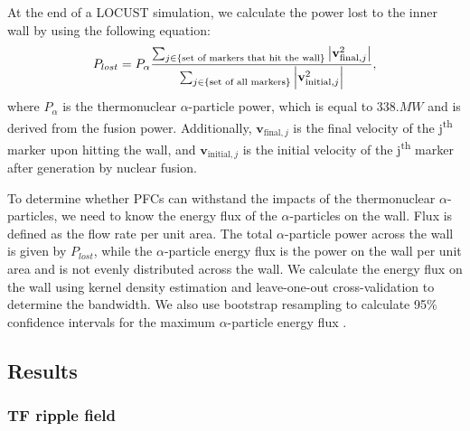 \documentclass[10pt, a4paper, twoside]{article}
\begin{document}
At the end of a LOCUST simulation, we calculate the power lost to the inner wall by using the following equation: 
\begin{equation} 
P_{lost} = P_\alpha \frac{\sum_{j\in \text{\{set of markers that hit the wall\}}}\abs{\textbf{v}_{\text{final}, j}^2}}{\sum_{j \in \{\text{set of all markers}\}} \abs{\mathbf{v}_{\text{initial}, j}^2 }}, 
\end{equation}
where $P_\alpha$ is the thermonuclear $\alpha$-particle power, which is equal to $\si{338.MW}$ and is derived from the fusion power. Additionally, $\mathbf{v}_{\text{final}, j}$ is the final velocity of the j\textsuperscript{th} marker upon hitting the wall, and $\mathbf{v}_{\text{initial}, j}$ is the initial velocity of the j\textsuperscript{th} marker after generation by nuclear fusion.

To determine whether PFCs can withstand the impacts of the thermonuclear $\alpha$-particles, we need to know the energy flux of the $\alpha$-particles on the wall. Flux is defined as the flow rate per unit area. The total $\alpha$-particle power across the wall is given by $P_{lost}$, while the $\alpha$-particle energy flux is the power on the wall per unit area and is not evenly distributed across the wall. We calculate the energy flux on the wall using kernel density estimation \cite{chen2017} and leave-one-out cross-validation \cite{chen2017} to determine the bandwidth. We also use bootstrap resampling to calculate 95\% confidence intervals for the maximum $\alpha$-particle energy flux \cite{chen2017}.


\subsection{Results}

\subsubsection{TF ripple field}
\label{sec:tf_ripple_field}
\end{document}
